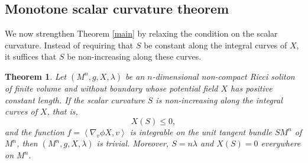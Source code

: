 \documentclass[a4paper, twoside, 10pt]{article}
\numberwithin{equation}{section}
\newtheorem{theorem}{Theorem}[section]
\theoremstyle{definition}
\begin{document}
\subsection{Monotone scalar curvature theorem}


We now strengthen Theorem \ref{main} by relaxing the condition on the
scalar curvature. Instead of requiring that $S$ be constant along the
integral curves of $X$, it suffices that $S$ be non-increasing along these curves.




\begin{theorem}\label{thm:monotone}
Let \((M^{n},g, X,\lambda)\) be an \(n\)-dimensional non-compact Ricci
soliton of finite volume and without boundary whose potential field \(X\) has positive constant length. If the scalar curvature $S$ is non-increasing along the integral curves of $X$,
that is,
\[
X(S)\leq 0,
\]
and the function
$f=\left\langle \nabla _{v}\phi X,v\right\rangle$ is integrable on the
unit tangent bundle $SM^{n}$ of $M^{n}$, then
$\left( M^{n},g,X,\lambda \right)$ is trivial. Moreover,
$S=n\lambda$ and $X(S)=0$ everywhere on $M^{n}$.
\end{theorem}
\end{document}
